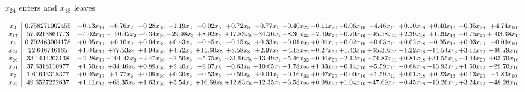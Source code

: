 \documentclass[9pt]{article}
\begin{document}
 $ x_{24} $ enters and $ x_{18} $ leaves 

 \[\begin{array}{c| c c@{\hskip 2pt} c@{\hskip 2pt} c@{\hskip 2pt} c@{\hskip 2pt} c@{\hskip 2pt} c@{\hskip 2pt} c@{\hskip 2pt} c@{\hskip 2pt} c@{\hskip 2pt} c@{\hskip 2pt} c@{\hskip 2pt} c@{\hskip 2pt} c@{\hskip 2pt} c@{\hskip 2pt} c@{\hskip 2pt} }
 x_{4}   &  0.758271002455 & -0.13 x_{19} & -6.76 x_{2} & -0.28 x_{30} & -1.19 x_{3} & -0.02 x_{5} & +  0.72 x_{8} & -0.77 x_{1} & -0.40 x_{22} & -0.11 x_{20} & -0.06 x_{16} & -4.46 x_{11} & +  0.10 x_{18} & +  0.40 x_{13} & -0.35 x_{29} & +  4.74 x_{10}\\
 x_{17}   &  57.9213861773 & -4.02 x_{19} & -150.42 x_{2} & -6.34 x_{30} & -29.98 x_{3} & +  8.92 x_{5} & + 17.83 x_{8} & -34.20 x_{1} & -8.30 x_{22} & -2.49 x_{20} & -0.70 x_{16} & -95.58 x_{11} & +  2.39 x_{18} & +  1.20 x_{13} & -6.75 x_{29} & + 103.38 x_{10}\\
 x_{6}   &  0.702463004178 & +  0.05 x_{19} & +  0.10 x_{2} & +  0.04 x_{30} & +  0.43 x_{3} & -0.45 x_{5} & -0.15 x_{8} & +  0.33 x_{1} & -0.01 x_{22} & +  0.01 x_{20} & -0.02 x_{16} & +  0.03 x_{11} & +  0.02 x_{18} & -0.05 x_{13} & +  0.03 x_{29} & -0.09 x_{10}\\
 x_{24}   &  22.646746165 & +  1.04 x_{19} & + 77.53 x_{2} & +  1.94 x_{30} & +  4.72 x_{3} & + 15.60 x_{5} & +  8.58 x_{8} & +  2.97 x_{1} & +  4.18 x_{22} & -0.27 x_{20} & +  1.43 x_{16} & + 65.30 x_{11} & -1.22 x_{18} & -14.54 x_{13} & +  3.11 x_{29} & -46.79 x_{10}\\
 x_{26}   &  33.1444203138 & -2.28 x_{19} & -101.43 x_{2} & -2.47 x_{30} & -2.50 x_{3} & -5.75 x_{5} & -31.96 x_{8} & + 13.49 x_{1} & -5.46 x_{22} & -0.91 x_{20} & -2.12 x_{16} & -74.87 x_{11} & +  0.81 x_{18} & + 31.55 x_{13} & -4.44 x_{29} & + 63.70 x_{10}\\
 x_{21}   &  37.6318110977 & +  1.50 x_{19} & + 34.46 x_{2} & +  0.89 x_{30} & +  2.40 x_{3} & -9.07 x_{5} & -0.63 x_{8} & + 10.65 x_{1} & +  1.78 x_{22} & +  1.33 x_{20} & -0.14 x_{16} & +  5.59 x_{11} & -0.68 x_{18} & -13.93 x_{13} & +  1.50 x_{29} & -29.70 x_{10}\\
 x_{7}   &  1.61643318377 & +  0.05 x_{19} & +  1.77 x_{2} & +  0.09 x_{30} & +  0.30 x_{3} & -0.53 x_{5} & -0.59 x_{8} & +  0.04 x_{1} & +  0.16 x_{22} & +  0.07 x_{20} & -0.00 x_{16} & +  1.59 x_{11} & +  0.01 x_{18} & +  0.23 x_{13} & +  0.13 x_{29} & -1.83 x_{10}\\
 x_{23}   &  49.6527222637 & +  1.11 x_{19} & + 68.35 x_{2} & +  1.63 x_{30} & +  3.54 x_{3} & + 16.68 x_{5} & + 12.83 x_{8} & -12.35 x_{1} & +  3.58 x_{22} & +  0.08 x_{20} & +  1.04 x_{16} & + 47.69 x_{11} & -0.45 x_{18} & -10.20 x_{13} & +  3.24 x_{29} & -48.28 x_{10}\\

\end{array}\]
\end{document}
